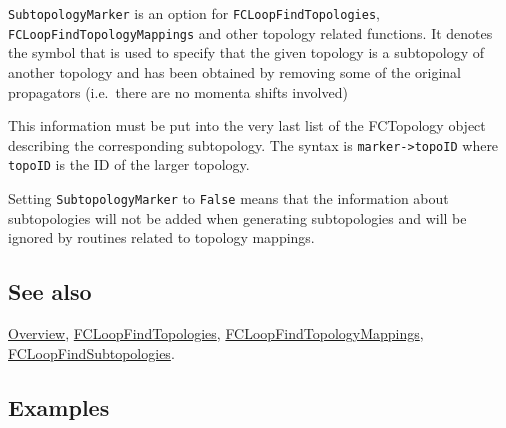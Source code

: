 \documentclass[../FeynCalcManual.tex]{subfiles}
\begin{document}
\texttt{SubtopologyMarker} is an option for
\texttt{FCLoopFindTopologies}, \texttt{FCLoopFindTopologyMappings} and
other topology related functions. It denotes the symbol that is used to
specify that the given topology is a subtopology of another topology and
has been obtained by removing some of the original propagators
(i.e.~there are no momenta shifts involved)

This information must be put into the very last list of the FCTopology
object describing the corresponding subtopology. The syntax is
\texttt{marker->topoID} where \texttt{topoID} is the ID of the larger
topology.

Setting \texttt{SubtopologyMarker} to \texttt{False} means that the
information about subtopologies will not be added when generating
subtopologies and will be ignored by routines related to topology
mappings.

\subsection{See also}

\hyperlink{toc}{Overview},
\hyperlink{fcloopfindtopologies}{FCLoopFindTopologies},
\hyperlink{fcloopfindtopologymappings}{FCLoopFindTopologyMappings},
\hyperlink{fcloopfindsubtopologies}{FCLoopFindSubtopologies}.

\subsection{Examples}
\end{document}

